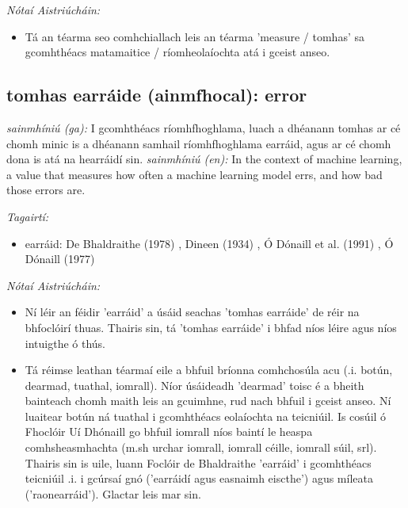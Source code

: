 \documentclass{article}
\begin{document}
 \noindent \textit{Nótaí Aistriúcháin:}
\begin{itemize}
	\item Tá an téarma seo comhchiallach leis an téarma 'measure / tomhas' sa gcomhthéacs matamaitice / ríomheolaíochta atá i gceist anseo.
\end{itemize}


\subsection*{tomhas earráide (ainmfhocal): error} 
 \noindent \textit{sainmhíniú (ga):} I gcomhthéacs ríomhfhoghlama, luach a dhéanann tomhas ar cé chomh minic is a dhéanann samhail ríomhfhoghlama earráid, agus ar cé chomh dona is atá na hearráidí sin.
\newline\newline
 \noindent \textit{sainmhíniú (en):} In the context of machine learning, a value that measures how often a machine learning model errs, and how bad those errors are.
\newline

 \noindent \textit{Tagairtí:}
\begin{itemize}
	\item earráid: De Bhaldraithe (1978) \cite{de-bhaldraithe}, Dineen (1934) \cite{dineen}, Ó Dónaill et al. (1991) \cite{focloir-beag}, Ó Dónaill (1977) \cite{odonaill}
\end{itemize}

 \noindent \textit{Nótaí Aistriúcháin:}
\begin{itemize}
	\item Ní léir an féidir 'earráid' a úsáid seachas 'tomhas earráide' de réir na bhfoclóirí thuas. Thairis sin, tá 'tomhas earráide' i bhfad níos léire agus níos intuigthe ó thús.
	\item Tá réimse leathan téarmaí eile a bhfuil bríonna comhchosúla acu (.i. botún, dearmad, tuathal, iomrall). Níor úsáideadh 'dearmad' toisc é a bheith bainteach chomh maith leis an gcuimhne, rud nach bhfuil i gceist anseo. Ní luaitear botún ná tuathal i gcomhthéacs eolaíochta na teicniúil. Is cosúil ó Fhoclóir Uí Dhónaill go bhfuil iomrall níos baintí le  heaspa comhsheasmhachta (m.sh urchar iomrall, iomrall céille, iomrall súil, srl). Thairis sin is uile, luann Foclóir de Bhaldraithe 'earráid' i gcomhthéacs teicniúil .i. i gcúrsaí gnó ('earráidí agus easnaimh eiscthe') agus míleata ('raonearráid'). Glactar leis mar sin.
\end{itemize}
\end{document}
